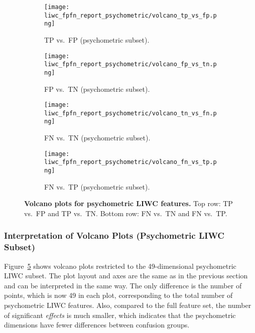 \begin{figure}[H]
  \centering
  
  \begin{subfigure}[t]{0.49\textwidth}
    \centering
    \texttt{[image: liwc\_fpfn\_report\_psychometric/volcano\_tp\_vs\_fp.png]}
    \caption{TP vs.\ FP (psychometric subset).}
    \label{fig:volcano_psycho_tp_vs_fp}
  \end{subfigure}\hfill
  \begin{subfigure}[t]{0.49\textwidth}
    \centering
    \texttt{[image: liwc\_fpfn\_report\_psychometric/volcano\_fp\_vs\_tn.png]}
    \caption{FP vs.\ TN (psychometric subset).}
    \label{fig:volcano_psycho_tp_vs_tn}
  \end{subfigure}
  
  \vspace{0.5cm}
  
  \begin{subfigure}[t]{0.49\textwidth}
    \centering
    \texttt{[image: liwc\_fpfn\_report\_psychometric/volcano\_tn\_vs\_fn.png]}
    \caption{FN vs.\ TN (psychometric subset).}
    \label{fig:volcano_psycho_fn_vs_tn}
  \end{subfigure}\hfill
  \begin{subfigure}[t]{0.49\textwidth}
    \centering
    \texttt{[image: liwc\_fpfn\_report\_psychometric/volcano\_fn\_vs\_tp.png]}
    \caption{FN vs.\ TP (psychometric subset).}
    \label{fig:volcano_psycho_fn_vs_tp}
  \end{subfigure}

  \caption[Volcano plots for psychometric LIWC features.]{\textbf{Volcano plots for psychometric LIWC features.} 
  Top row: TP vs.\ FP and TP vs.\ TN. Bottom row: FN vs.\ TN and FN vs.\ TP.}
  \label{fig:volcano_psycho_features}
\end{figure}

\subsubsection{Interpretation of Volcano Plots (Psychometric LIWC Subset)}

Figure~\ref{fig:volcano_psycho_features} shows volcano plots restricted to the 49-dimensional psychometric LIWC subset. The plot layout and axes are the same as in the previous section and can be interpreted  in the same way. The only difference is the number of points, which is now 49 in each plot, corresponding to the total number of psychometric LIWC features. Also, compared to the full feature set, the number of significant \textit{effects} is much smaller, which indicates that the psychometric dimensions have fewer differences between confusion groups.

